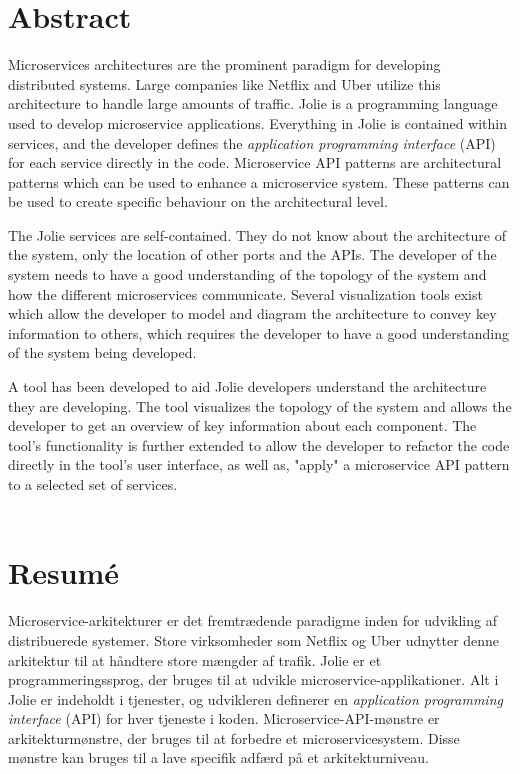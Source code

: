 \section*{\centering Abstract}
Microservices architectures are the prominent paradigm for developing distributed systems.
Large companies like Netflix and Uber utilize this architecture to handle large amounts of traffic.
Jolie is a programming language used to develop microservice applications.
Everything in Jolie is contained within services, and the developer defines the \emph{application programming interface} (API) for each service directly in the code.
Microservice API patterns are architectural patterns which can be used to enhance a microservice system.
These patterns can be used to create specific behaviour on the architectural level.

The Jolie services are self-contained. They do not know about the architecture of the system, only the location of other ports and the APIs.
The developer of the system needs to have a good understanding of the topology of the system and how the different microservices communicate.
Several visualization tools exist which allow the developer to
 model and diagram the architecture to convey key information to others, which requires the developer to have a good understanding of the system being developed.

A tool has been developed to aid Jolie developers understand the architecture they are developing. The tool visualizes the topology of the system and allows the developer to 
get an overview of key information about each component. The tool's functionality is further extended to allow the developer to refactor the code directly in the tool's user interface, as well as, "apply" a microservice API pattern to a selected set of services.
\\
\\
\section*{\centering Resumé}
Microservice-arkitekturer er det fremtrædende paradigme inden for udvikling af distribuerede systemer.
Store virksomheder som Netflix og Uber udnytter denne arkitektur til at håndtere store mængder af trafik.
Jolie er et programmeringssprog, der bruges til at udvikle microservice-applikationer.
Alt i Jolie er indeholdt i tjenester, og udvikleren definerer en \emph{application programming interface} (API) for hver tjeneste i koden.
Microservice-API-mønstre er arkitekturmønstre, der bruges til at forbedre et microservicesystem.
Disse mønstre kan bruges til a lave specifik adfærd på et arkitekturniveau.

